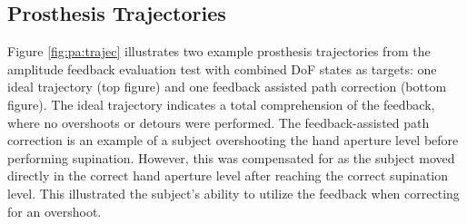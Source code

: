 
\subsection{Prosthesis Trajectories}

Figure \ref{fig:pa:trajec} illustrates two example prosthesis trajectories from the amplitude feedback evaluation test with combined DoF states as targets: one ideal trajectory (top figure) and one feedback assisted path correction (bottom figure). The ideal trajectory indicates a total comprehension of the feedback, where no overshoots or detours were performed. The feedback-assisted path correction is an example of a subject overshooting the hand aperture level before performing supination. However, this was compensated for as the subject moved directly in the correct hand aperture level after reaching the correct supination level. This illustrated the subject's ability to utilize the feedback when correcting for an overshoot. 

